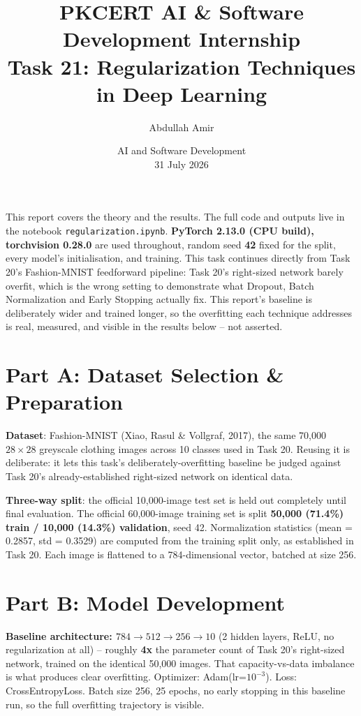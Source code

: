 \documentclass[11pt,a4paper]{article}
\title{\vspace{-1.5cm}\textbf{PKCERT AI \& Software Development Internship \\ Task 21: Regularization Techniques in Deep Learning}}
\author{Abdullah Amir}
\date{AI and Software Development \\ 31 July 2026}
\begin{document}
\maketitle
\vspace{-0.8cm}

This report covers the theory and the results. The full code and outputs live in the
notebook \texttt{regularization.ipynb}. \textbf{PyTorch 2.13.0 (CPU build), torchvision
0.28.0} are used throughout, random seed \textbf{42} fixed for the split, every model's
initialisation, and training. This task continues directly from Task 20's Fashion-MNIST
feedforward pipeline: Task 20's right-sized network barely overfit, which is the wrong
setting to demonstrate what Dropout, Batch Normalization and Early Stopping actually
fix. This report's baseline is deliberately wider and trained longer, so the
overfitting each technique addresses is real, measured, and visible in the results
below -- not asserted.

\section*{Part A: Dataset Selection \& Preparation}

\textbf{Dataset}: Fashion-MNIST (Xiao, Rasul \& Vollgraf, 2017), the same 70,000
$28\times28$ greyscale clothing images across 10 classes used in Task 20. Reusing it is
deliberate: it lets this task's deliberately-overfitting baseline be judged against
Task 20's already-established right-sized network on identical data.

\textbf{Three-way split}: the official 10,000-image test set is held out completely
until final evaluation. The official 60,000-image training set is split
\textbf{50,000 (71.4\%) train / 10,000 (14.3\%) validation}, seed 42. Normalization
statistics (mean = 0.2857, std = 0.3529) are computed from the training split only, as
established in Task 20. Each image is flattened to a 784-dimensional vector, batched at
size 256.

\section*{Part B: Model Development}

\textbf{Baseline architecture: $784 \to 512 \to 256 \to 10$} (2 hidden layers, ReLU, no
regularization at all) -- roughly \textbf{4x} the parameter count of Task 20's
right-sized network, trained on the identical 50,000 images. That capacity-vs-data
imbalance is what produces clear overfitting. Optimizer: Adam(lr=$10^{-3}$). Loss:
CrossEntropyLoss. Batch size 256, 25 epochs, no early stopping in this baseline run, so
the full overfitting trajectory is visible.
\end{document}
